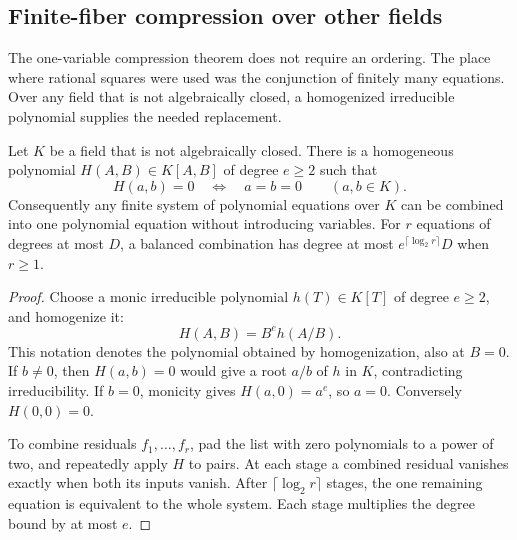 \subsection{Finite-fiber compression over other fields}
\label{subsec:finite-fibre-fields}

The one-variable compression theorem does not require an ordering. The
place where rational squares were used was the conjunction of finitely
many equations. Over any field that is not algebraically closed, a
homogenized irreducible polynomial supplies the needed replacement.

\begin{lemma}\label{lem:anisotropic-binary-conjunction}
Let $K$ be a field that is not algebraically closed. There is a homogeneous
polynomial $H(A,B)\in K[A,B]$ of degree $e\ge2$ such that
\[
 H(a,b)=0\quad\Longleftrightarrow\quad a=b=0
 \qquad(a,b\in K).
\]
Consequently any finite system of polynomial equations over $K$ can be
combined into one polynomial equation without introducing variables.
For $r$ equations of degrees at most $D$, a balanced combination has
degree at most $e^{\lceil\log_2 r\rceil}D$ when $r\ge1$.
\end{lemma}
\begin{proof}
Choose a monic irreducible polynomial $h(T)\in K[T]$ of degree $e\ge2$,
and homogenize it:
\[
 H(A,B)=B^e h(A/B).
\]
This notation denotes the polynomial obtained by homogenization, also
at $B=0$. If $b\ne0$, then $H(a,b)=0$ would give a root $a/b$ of $h$
in $K$, contradicting irreducibility. If $b=0$, monicity gives
$H(a,0)=a^e$, so $a=0$. Conversely $H(0,0)=0$.

To combine residuals $f_1,\ldots,f_r$, pad the list with zero
polynomials to a power of two, and repeatedly apply $H$ to pairs.
At each stage a combined residual vanishes exactly when both its
inputs vanish. After $\lceil\log_2 r\rceil$ stages, the one remaining
equation is equivalent to the whole system. Each stage multiplies
the degree bound by at most $e$.
\end{proof}

